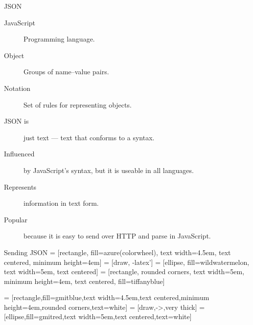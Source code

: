 \documentclass{beamer}
\begin{document}
\begin{frame}{JSON}
  \begin{description}
    \item[JavaScript] Programming language.
    \item[Object] Groups of name--value pairs.
    \item[Notation] Set of rules for representing objects.\\[1cm]
    \item[JSON is] just text --- text that conforms to a syntax.
    \item[Influenced] by JavaScript's syntax, but it is useable in all languages.
    \item[Represents] information in text form.
    \item[Popular] because it is easy to send over HTTP and parse in JavaScript.
  \end{description}
\end{frame}

\begin{frame}{Sending JSON}
   = [rectangle, fill=azure(colorwheel), text width=4.5em, text centered, minimum height=4em]
   = [draw, -latex']
   = [ellipse, fill=wildwatermelon, text width=5em, text centered]
   = [rectangle, rounded corners, text width=5em, minimum height=4em, text centered, fill=tiffanyblue]
  
  \begin{adjustbox}{max totalsize={.9\textwidth}{.6\textheight},center}
  
   = [rectangle,fill=gmitblue,text width=4.5em,text centered,minimum height=4em,rounded corners,text=white]
   = [draw,->,very thick]
   = [ellipse,fill=gmitred,text width=5em,text centered,text=white]
    
  \end{adjustbox}
\end{frame}
\end{document}
